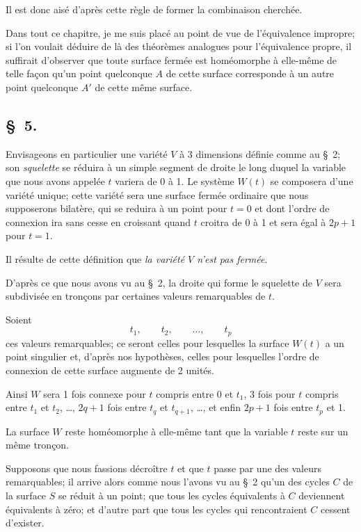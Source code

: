 \documentclass{article}
\begin{document}
Il est donc aisé d'après cette règle de former la combinaison cherchée.

Dans tout ce chapitre, je me suis placé au point de vue de l'équivalence impropre; si l'on voulait déduire de là des théorèmes analogues pour l'équivalence propre, il suffirait d'observer que toute surface fermée est homéomorphe à elle-même de telle façon qu'un point quelconque $A$ de cette surface corresponde à un autre point quelconque $A'$ de cette même surface.

\subsection*{\S~5.}

Envisageons en particulier une variété $V$ à 3 dimensions définie comme au \S~2; son \emph{squelette} se réduira à un simple segment de droite le long duquel la variable que nous avons appelée $t$ variera de 0 à 1. Le système $W(t)$ se composera d'une variété unique; cette variété sera une surface fermée ordinaire que nous supposerons bilatère, qui se reduira à un point pour $t = 0$ et dont l'ordre de connexion ira sans cesse en croissant quand $t$ croitra de 0 à 1 et sera égal à $2p + 1$ pour $t = 1$.

Il résulte de cette définition que \emph{la variété $V$ n'est pas fermée}.

D'après ce que nous avons vu au \S~2, la droite qui forme le squelette de $V$ sera subdivisée en tronçons par certaines valeurs remarquables de $t$.

Soient
\[ t_{1}, \qquad t_{2}, \qquad \ldots, \qquad t_{p} \]
ces valeurs remarquables; ce seront celles pour lesquelles la surface $W(t)$ a un point singulier et, d'après nos hypothèses, celles pour lesquelles l'ordre de connexion de cette surface augmente de 2 unités.


Ainsi $W$ sera 1 fois connexe pour $t$ compris entre 0 et $t_{1}$, 3 fois pour $t$ compris entre $t_{1}$ et $t_{2}$, \ldots, $2q + 1$ fois entre $t_{q}$ et $t_{q+1}$, \ldots, et enfin $2p + 1$ fois entre $t_{p}$ et 1.

La surface $W$ reste homéomorphe à elle-même tant que la variable $t$ reste sur un même tronçon.

Supposons que nous fassions décroître $t$ et que $t$ passe par une des valeurs remarquables; il arrive alors comme nous l'avons vu au \S~2 qu'un des cycles $C$ de la surface $S$ se réduit à un point; que tous les cycles équivalents à $C$ deviennent équivalents à zéro; et d'autre part que tous les cycles qui rencontraient $C$ cessent d'exister.
\end{document}
